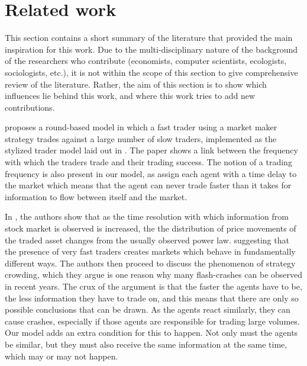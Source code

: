 \section{Related work}\label{section_relatedWork}

This section contains a short summary of the literature that provided the main inspiration for this work. Due to the multi-disciplinary nature of the background of the researchers who contribute (economists, computer scientists, ecologists, sociologists, etc.), it is not within the scope of this section to give  comprehensive review of the literature. Rather, the aim of this section is to show which influences lie behind this work, and where this work tries to add new contributions.

\cite{chiwang2013investigating} proposes a round-based model in which a fast trader using a market maker strategy trades against a large number of slow traders, implemented as the stylized trader model laid out in \cite{chiarella2009impact}. The paper shows a link between the frequency with which the traders trade and their trading success. The notion of a trading frequency is also present in our model, as assign each agent with a time delay to the market which means that the agent can never trade faster than it takes for information to flow between itself and the market.

In \cite{johnson2012financial}, the authors show that as the time resolution with which information from stock market is observed is increased, the the distribution of price movements of the traded asset changes from the usually observed power law.  suggesting that the presence of very fast traders creates markets which behave in fundamentally different ways. The authors then proceed to discuss the phenomenon of strategy crowding, which they argue is one reason why many flash-crashes can be observed in recent years. The crux of the argument is that the faster the agents have to be, the less information they have to trade on, and this means that there are only so possible conclusions that can be drawn. As the agents react similarly, they can cause crashes, especially if those agents are responsible for trading large volumes. Our model adds an extra condition for this to happen. Not only must the agents be similar, but they must also receive the same information at the same time, which may or may not happen.

